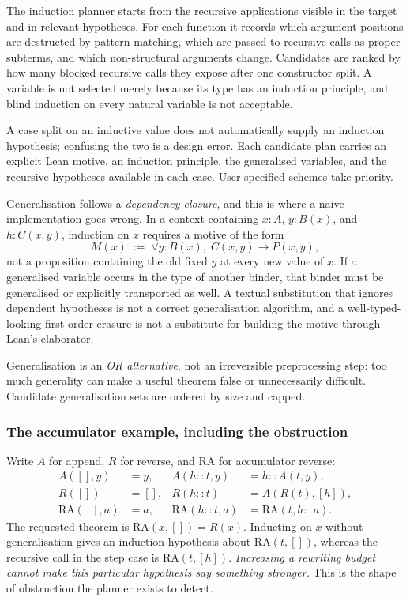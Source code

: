 The induction planner starts from the recursive applications visible in the
target and in relevant hypotheses. For each function it records which argument
positions are destructed by pattern matching, which are passed to recursive
calls as proper subterms, and which non-structural arguments change. Candidates
are ranked by how many blocked recursive calls they expose after one constructor
split. A variable is not selected merely because its type has an induction
principle, and blind induction on every natural variable is not acceptable.

A case split on an inductive value does not automatically supply an induction
hypothesis; confusing the two is a design error. Each candidate plan carries an
explicit Lean motive, an induction principle, the generalised variables, and the
recursive hypotheses available in each case. User-specified schemes take
priority.

Generalisation follows a \emph{dependency closure}, and this is where a naive
implementation goes wrong. In a context containing $x:A$, $y:B(x)$, and
$h:C(x,y)$, induction on $x$ requires a motive of the form
\[
  M(x)\;:=\;\forall y:B(x),\; C(x,y)\to P(x,y),
\]
not a proposition containing the old fixed $y$ at every new value of $x$. If a
generalised variable occurs in the type of another binder, that binder must be
generalised or explicitly transported as well. A textual substitution that
ignores dependent hypotheses is not a correct generalisation algorithm, and a
well-typed-looking first-order erasure is not a substitute for building the
motive through Lean's elaborator.

Generalisation is an \emph{OR alternative}, not an irreversible preprocessing
step: too much generality can make a useful theorem false or unnecessarily
difficult. Candidate generalisation sets are ordered by size and capped.

\subsubsection*{The accumulator example, including the obstruction}

Write $A$ for append, $R$ for reverse, and $\mathrm{RA}$ for accumulator
reverse:
\begin{align*}
A([],y)&=y,& A(h::t,y)&=h::A(t,y),\\
R([])&=[],& R(h::t)&=A(R(t),[h]),\\
\mathrm{RA}([],a)&=a,& \mathrm{RA}(h::t,a)&=\mathrm{RA}(t,h::a).
\end{align*}
The requested theorem is $\mathrm{RA}(x,[])=R(x)$. Inducting on $x$ without
generalisation gives an induction hypothesis about $\mathrm{RA}(t,[])$, whereas
the recursive call in the step case is $\mathrm{RA}(t,[h])$. \emph{Increasing a
rewriting budget cannot make this particular hypothesis say something
stronger.} This is the shape of obstruction the planner exists to detect.

